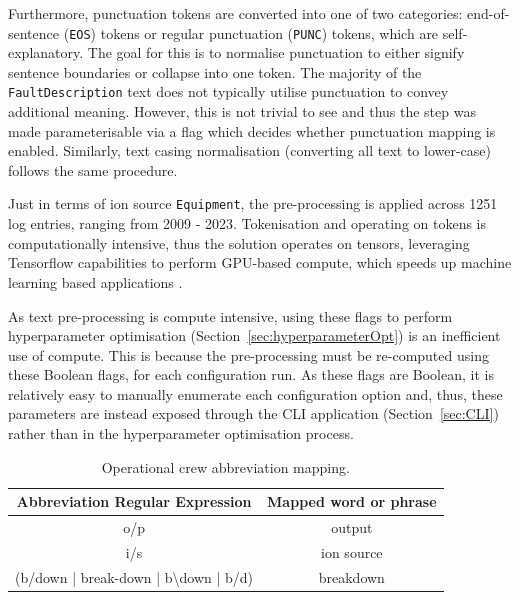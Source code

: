 \documentclass[10pt,oneside]{report}
\begin{document}
Furthermore, punctuation tokens are converted into one of two categories: end-of-sentence (\texttt{EOS}) tokens or regular punctuation (\texttt{PUNC}) tokens, which are self-explanatory. The goal for this is to normalise punctuation to either signify sentence boundaries or collapse into one token. The majority of the \texttt{FaultDescription} text does not typically utilise punctuation to convey additional meaning. However, this is not trivial to see and thus the step was made parameterisable via a flag which decides whether punctuation mapping is enabled. Similarly, text casing normalisation (converting all text to lower-case) follows the same procedure. 

Just in terms of ion source \texttt{Equipment}, the pre-processing is applied across 1251 log entries, ranging from 2009 - 2023. Tokenisation and operating on tokens is computationally intensive, thus the solution operates on tensors, leveraging Tensorflow capabilities to perform GPU-based compute, which speeds up machine learning based applications \cite{tensorflow2015whitepaper, baldini2014predicting}.

As text pre-processing is compute intensive, using these flags to perform hyperparameter optimisation (Section~\ref{sec:hyperparameterOpt}) is an inefficient use of compute. This is because the pre-processing must be re-computed using these Boolean flags, for each configuration run. As these flags are Boolean, it is relatively easy to manually enumerate each configuration option and, thus, these parameters are instead exposed through the CLI application (Section~\ref{sec:CLI}) rather than in the hyperparameter optimisation process.


\begin{table}[htbp]
    \fontsize{8}{12}\selectfont
    \centering
    \caption{Operational crew abbreviation mapping.}
    \label{tab:abbrevCrew}
    \begin{adjustbox}{max width=\textwidth}
    \begin{tabular}{c | c}
        \toprule
        \textbf{Abbreviation Regular Expression} & \textbf{Mapped word or phrase} \\
        \midrule
        {o/p} & {output} \\
        {i/s} & {ion source} \\
        {(b/down | break-down | b\textbackslash down | b/d)} & {breakdown} \\
        \bottomrule
    \end{tabular}
    \end{adjustbox}
\end{table}
\end{document}
